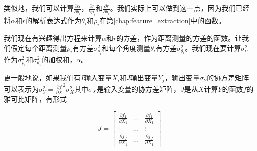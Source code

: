 

类似地，我们可以计算$\frac{\partial\alpha}{\partial\theta_i}$，$\frac{\partial r}{\partial\rho_i}$和$\frac{\partial r}{\partial\theta_i}$。我们实际上可以做到这一点，因为我们已经将$\alpha$和$r$的解析表达式作为$\theta_i$和$\rho_i$在第\ref{chap:feature_extraction}中的函数。

我们现在有兴趣得出方程来计算$\alpha$和$r$的方差，作为距离测量的方差的函数。让我们假定每个距离测量$\rho_i$有方差$\sigma^2_{\rho_i}$和每个角度测量$\theta_i$有方差$\sigma^2_{\theta_i}$。我们现在要计算$\sigma^2_{\alpha}$作为$\sigma^2_{\rho_i}$和$\sigma^2_{\theta_i}$的加权和，$\alpha$。

更一般地说，如果我们有$I$输入变量$X_i$和$J$输出变量$Y_j$，输出变量$\sigma_Y$的协方差矩阵可以表示为$\sigma_Y^2=\frac{\partial f}{\partial X}^2\sigma_X^2$其中$\sigma_X$是输入变量的协方差矩阵，$J$是从$X$计算$Y$的函数$f$的雅可比矩阵，有形式

\begin{equation}
J=\left[
\begin{array}{ccc}
  \frac{\partial f_1}{\partial X_1} & \ldots & \frac{\partial f_1}{\partial X_I}\\
  \vdots & \ldots & \vdots\\
  \frac{\partial f_J}{\partial X_1} & \ldots & \frac{\partial f_J}{\partial X_I}
 \end{array}
 \right]
\end{equation}


